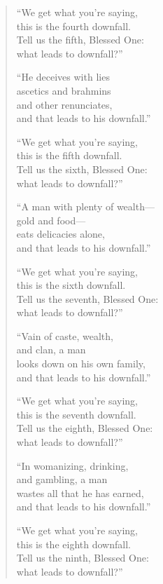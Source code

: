 \documentclass[12pt,openany]{book}%
\begin{document}
\begin{verse}
“We get what you’re saying, \\
this is the fourth downfall. \\
Tell us the fifth, Blessed One: \\
what leads to downfall?” 

“He deceives with lies \\
ascetics and brahmins \\
and other renunciates, \\
and that leads to his downfall.” 

“We get what you’re saying, \\
this is the fifth downfall. \\
Tell us the sixth, Blessed One: \\
what leads to downfall?” 

“A man with plenty of wealth—\\
gold and food—\\
eats delicacies alone, \\
and that leads to his downfall.” 

“We get what you’re saying, \\
this is the sixth downfall. \\
Tell us the seventh, Blessed One: \\
what leads to downfall?” 

“Vain of caste, wealth, \\
and clan, a man \\
looks down on his own family, \\
and that leads to his downfall.” 

“We get what you’re saying, \\
this is the seventh downfall. \\
Tell us the eighth, Blessed One: \\
what leads to downfall?” 

“In womanizing, drinking, \\
and gambling, a man \\
wastes all that he has earned, \\
and that leads to his downfall.” 

“We get what you’re saying, \\
this is the eighth downfall. \\
Tell us the ninth, Blessed One: \\
what leads to downfall?” 


\end{verse}
\end{document}
